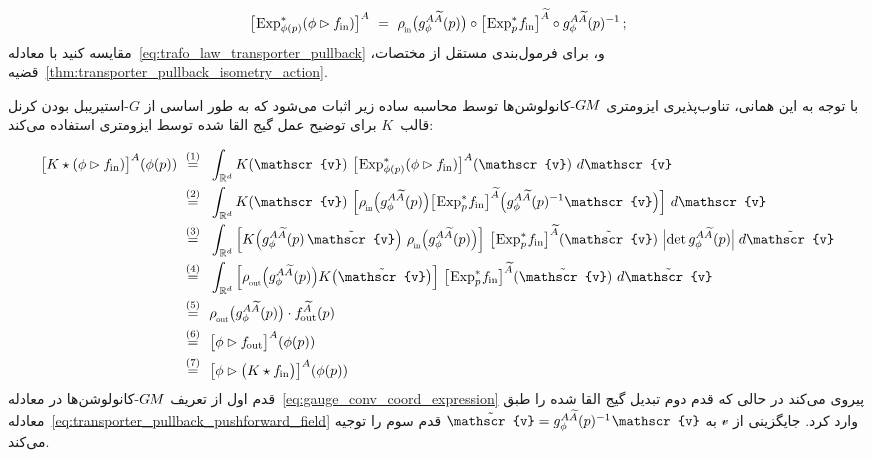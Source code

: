 \begin{align}\label{eq:transporter_pullback_pushforward_field}
	\big[\mkern-2mu \Expsphip (\phi\rhd\fin) \big]^A\ =\ 
	\rhoin\big( g_\phi^{A\widetilde{A}}(p)\big) \circ \big[\mkern-2mu \Expspfin\big]^{\widetilde{A}} \circ g_\phi^{A\widetilde{A}}(p)^{-1} \,;
\end{align}
مقایسه کنید با معادله~\eqref{eq:trafo_law_transporter_pullback} و، برای فرمول‌بندی مستقل از مختصات، قضیه~\ref{thm:transporter_pullback_isometry_action}.

با توجه به این همانی، تناوب‌پذیری ایزومتری $G\mkern-1.4muM$-کانولوشن‌ها
توسط محاسبه ساده زیر اثبات می‌شود که به طور اساسی از $G$-استیریبل بودن کرنل قالب~$K$ برای توضیح عمل گیج القا شده توسط ایزومتری استفاده می‌کند:

\begin{align}
	\big[ K \star (\phi \rhd \fin) \big]^A (\phi(p))
	\ \overset{(1)}{=}&\ \ 
	\int_{\R^d} K(\mathscr{v})\  \big[\mkern-2mu \Expsphip (\phi\rhd\fin) \big]^A (\mathscr{v})\ d\mathscr{v} \notag \\
	\ \overset{(2)}{=}&\ \ 
	\int_{\R^d} K(\mathscr{v})\ 
	\Big[ \rhoin\pig( g_\phi^{A\widetilde{A}}(p)\pig) \big[\mkern-2mu \Expspfin\big]^{\widetilde{A}} \pig(g_\phi^{A\widetilde{A}}(p)^{-1} \mathscr{v} \pig) \Big]\ d\mathscr{v} \notag \\
	\ \overset{(3)}{=}&\ \ 
	\int_{\R^d} \Big[ K\pig( g_\phi^{A\widetilde{A}}(p)\, \tilde{\mathscr{v}}\pig)\ \rhoin\pig( g_\phi^{A\widetilde{A}}(p)\pig) \Big]\ 
	\big[\mkern-2mu \Expspfin\big]^{\widetilde{A}} (\tilde{\mathscr{v}})\ 
	\pig|\mkern-3mu\det g_\phi^{A\widetilde{A}}(p)\pig|\; d\tilde{\mathscr{v}} \notag \\
	\ \overset{(4)}{=}&\ \ 
	\int_{\R^d} \Big[\rhoout\pig( g_\phi^{A\widetilde{A}}(p)\pig)  K\big(\tilde{\mathscr{v}}\big) \Big]\ 
	\big[\mkern-2mu \Expspfin\big]^{\widetilde{A}} (\tilde{\mathscr{v}})\ d\tilde{\mathscr{v}} \notag \\
	\ \overset{(5)}{=}&\ \ 
	\rhoout\big( g_\phi^{A\widetilde{A}}(p) \big) \cdot \fout^{\widetilde{A}}(p) \notag \\
	\ \overset{(6)}{=}&\ \ 
	\big[ \phi \rhd \fout \big]^A (\phi(p)) \notag \\
	\ \overset{(7)}{=}&\ \ 
	\big[ \phi \rhd \big(K \star \fin\big) \big]^A (\phi(p))
\end{align}
قدم اول از تعریف $G\mkern-1.4muM$-کانولوشن‌ها در معادله~\eqref{eq:gauge_conv_coord_expression} پیروی می‌کند در حالی که قدم دوم تبدیل گیج القا شده را طبق معادله~\eqref{eq:transporter_pullback_pushforward_field} وارد کرد.
جایگزینی از $\mathscr{v}$ به $\tilde{\mathscr{v}} = g_\phi^{A\widetilde{A}}(p)^{-1} \mkern1mu \mathscr{v}$ قدم سوم را توجیه می‌کند.
